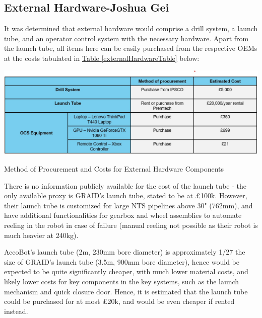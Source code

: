 \documentclass[11pt]{article}		%
\newcommand{\tableref}[1]{\hyperref[#1]{Table \ref*{#1}}}     %
\begin{document}
		\subsection[External Hardware]{External Hardware-Joshua Gei}
		It was determined that external hardware would comprise a drill system, a launch tube, and an operator control system with the necessary hardware. Apart from the launch tube, all items here can be easily purchased from the respective OEMs at the costs tabulated in \tableref{externalHardwareTable} below:
		
			\begin{table}[H]
	  		
	  		\centering
	  		\includegraphics[width=\textwidth]{External Hardware costs.jpg}
				\caption{Method of Procurement and Costs for External Hardware Components}
				\label{externalHardwareTable}
			\end{table}
		There is no information publicly available for the cost of the launch tube - the only available proxy is GRAID's launch tube, stated to be at £100k. However, their launch tube is customized for large NTS pipelines above 30" (762mm), and have additional functionalities for gearbox and wheel assemblies to automate reeling in the robot in case of failure (manual reeling not possible as their robot is much heavier at 240kg). 
		
		\hspace*{3ex}AccoBot's launch tube (2m, 230mm bore diameter) is approximately 1/27 the size of GRAID's launch tube (3.5m, 900mm bore diameter), hence would be expected to be quite significantly cheaper, with much lower material costs, and likely lower costs for key components in the key systems, such as the launch mechanism and quick closure door. Hence, it is estimated that the launch tube could be purchased for at most £20k, and would be even cheaper if rented instead. 
		
\end{document}
